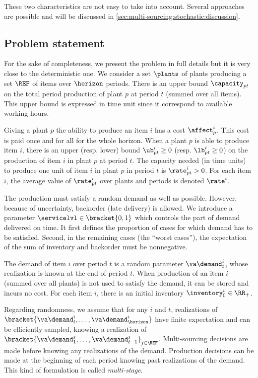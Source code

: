 These two characteristics are not easy to take into account.
Several approaches are possible and will be discussed in \cref{sec:multi-sourcing:stochastic:discussion}.



\subsection{Problem statement}
\label{sec:multi-sourcing:stochastic:introduction:problem-statement}


For the sake of completeness, we present the problem in full details but it is very close to the deterministic one.
We consider a set $\plants$ of plants producing a set $\REF$ of items over $\horizon$ periods.
There is an upper bound $\capacity_{pt}$ on the total period production of plant $p$ at period $t$ (summed over all items).
This upper bound is expressed in time unit since it correspond to available working hours.


Giving a plant $p$ the ability to produce an item $i$ has a cost $\affect_p^i$.
This cost is paid once and for all for the whole horizon.
When a plant $p$ is able to produce item $i$, there is an upper (resp. lower) bound $\ub_{pt}^i\ge 0$ (resp. $\lb_{pt}^i\ge 0$) on the production of item $i$ in plant $p$ at period $t$.
The capacity needed (in time units) to produce one unit of item $i$ in plant $p$ in period $t$ is $\rate_{pt}^i>0$.
For each item $i$, the average value of $\rate_{pt}^i$ over plants and periods is denoted $\rate^i$.


The production must satisfy a random demand as well as possible.
However, because of uncertainty, backorder (\ie late delivery) is allowed.
We introduce a parameter $\servicelvl\in\bracket{0,1}$ which controls the part of demand delivered on time.
It first defines the proportion of cases for which demand has to be satisfied.
Second, in the remaining cases (\ie the ``worst cases''), the expectation of the sum of inventory and backorder must be nonnegative.


The demand of item $i$ over period $t$ is a random parameter $\va\demand_t^i$, whose realization is known at the end of period $t$.
When production of an item $i$ (summed over all plants) is not used to satisfy the demand, it can be stored and incurs no cost.
For each item $i$, there is an initial inventory $\inventory_0^i\in\RR_+$.


Regarding randomness, we assume that for any $i$ and $t$, realizations of $\bracket{\va\demand_t^i,\ldots,\va\demand_{\horizon}^i}$ have finite expectation and can be efficiently sampled, knowing a realization of $\bracket{\va\demand_1^j,\ldots,\va\demand_{t-1}^j}_{j\in\REF}$.
Multi-sourcing decisions are made before knowing any realizations of the demand.
Production decisions can be made at the beginning of each period knowing past realizations of the demand.
This kind of formulation is called \emph{multi-stage}.


